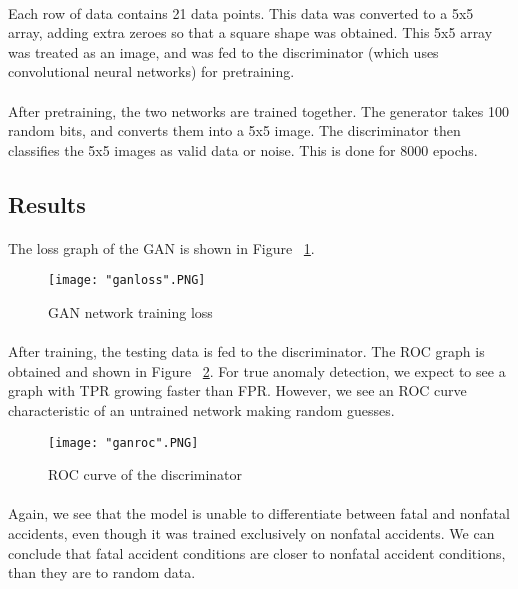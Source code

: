 \documentclass[a4paper, 12pt]{article}
\begin{document}
\paragraph{} Each row of data contains 21 data points. This data was converted to a 5x5 array, adding extra zeroes so that a square shape was obtained. This 5x5 array was treated as an image, and was fed to the discriminator (which uses convolutional neural networks) for pretraining.
\paragraph{} After pretraining, the two networks are trained together. The generator takes 100 random bits, and converts them into a 5x5 image. The discriminator then classifies the 5x5 images as valid data or noise. This is done for 8000 epochs.
\clearpage
\subsection{Results}
\paragraph{} The loss graph of the GAN is shown in Figure ~\ref{fig:ganloss}.
\begin{figure}[h]
\centering
\texttt{[image: "ganloss".PNG]}
\caption{GAN network training loss}
\label{fig:ganloss}
\end{figure}
\paragraph{} After training, the testing data is fed to the discriminator. The ROC graph is obtained and shown in Figure ~\ref{fig:ganroc}. For true anomaly detection, we expect to see a graph with TPR growing faster than FPR. However, we see an ROC curve characteristic of an untrained network making random guesses.
\begin{figure}[h]
\centering
\texttt{[image: "ganroc".PNG]}
\caption{ROC curve of the discriminator}
\label{fig:ganroc}
\end{figure}
\paragraph{} Again, we see that the model is unable to differentiate between fatal and nonfatal accidents, even though it was trained exclusively on nonfatal accidents. We can conclude that fatal accident conditions are closer to nonfatal accident conditions, than they are to random data.
\end{document}
